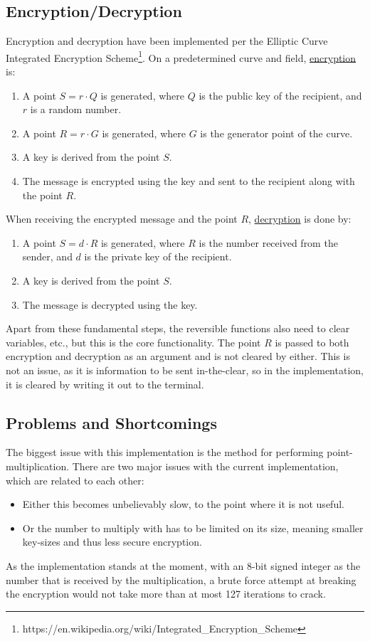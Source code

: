 \subsection{Encryption/Decryption}
Encryption and decryption have been implemented per the Elliptic Curve Integrated Encryption Scheme\footnote{https://en.wikipedia.org/wiki/Integrated\_Encryption\_Scheme}. On a predetermined curve and field, \underline{encryption} is:
\begin{enumerate}[1)]
\item A point $S=r\cdot Q$ is generated, where $Q$ is the public key of the recipient, and $r$ is a random number. 
\item A point $R=r\cdot G$ is generated, where $G$ is the generator point of the curve.
\item A key is derived from the point $S$.
\item The message is encrypted using the key and sent to the recipient along with the point $R$.
\end{enumerate}
When receiving the encrypted message and the point $R$, \underline{decryption} is done by:
\begin{enumerate}[1)]
\item A point $S=d\cdot R$ is generated, where $R$ is the number received from the sender, and $d$ is the private key of the recipient.
\item A key is derived from the point $S$.
\item The message is decrypted using the key.
\end{enumerate}
Apart from these fundamental steps, the reversible functions also need to clear variables, etc., but this is the core functionality. The point $R$ is passed to both encryption and decryption as an argument and is not cleared by either. This is not an issue, as it is information to be sent in-the-clear, so in the implementation, it is cleared by writing it out to the terminal. 
\subsection{Problems and Shortcomings}
\label{Problems}
The biggest issue with this implementation is the method for performing point-multiplication. There are two major issues with the current implementation, which are related to each other:
\begin{itemize}
\item Either this becomes unbelievably slow, to the point where it is not useful.
\item Or the number to multiply with has to be limited on its size, meaning smaller key-sizes and thus less secure encryption.
\end{itemize}
As the implementation stands at the moment, with an 8-bit signed integer as the number that is received by the multiplication, a brute force attempt at breaking the encryption would not take more than at most 127 iterations to crack.

